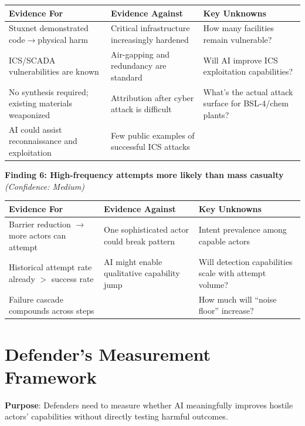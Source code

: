 \documentclass[11pt,letterpaper]{article}
\begin{document}
\begin{center}
\small
\begin{tabular}{L{4cm}L{4cm}L{4cm}}
\toprule
\textbf{Evidence For} & \textbf{Evidence Against} & \textbf{Key Unknowns} \\
\midrule
Stuxnet demonstrated code$\to$physical harm & Critical infrastructure increasingly hardened & How many facilities remain vulnerable? \\
ICS/SCADA vulnerabilities are known & Air-gapping and redundancy are standard & Will AI improve ICS exploitation capabilities? \\
No synthesis required; existing materials weaponized & Attribution after cyber attack is difficult & What's the actual attack surface for BSL-4/chem plants? \\
AI could assist reconnaissance and exploitation & Few public examples of successful ICS attacks & \\
\bottomrule
\end{tabular}
\end{center}

\textbf{Finding 6: High-frequency attempts more likely than mass casualty} \textit{(Confidence: Medium)}

\begin{center}
\small
\begin{tabular}{L{4cm}L{4cm}L{4cm}}
\toprule
\textbf{Evidence For} & \textbf{Evidence Against} & \textbf{Key Unknowns} \\
\midrule
Barrier reduction $\to$ more actors can attempt & One sophisticated actor could break pattern & Intent prevalence among capable actors \\
Historical attempt rate already $>$ success rate & AI might enable qualitative capability jump & Will detection capabilities scale with attempt volume? \\
Failure cascade compounds across steps & & How much will ``noise floor'' increase? \\
\bottomrule
\end{tabular}
\end{center}

\section{Defender's Measurement Framework}

\textbf{Purpose}: Defenders need to measure whether AI meaningfully improves hostile actors' capabilities without directly testing harmful outcomes.
\end{document}
